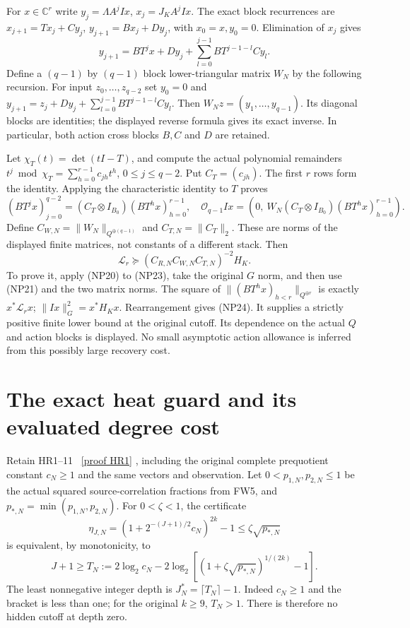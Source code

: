 \documentclass[11pt]{article}
\newcommand{\C}{\mathbb C}
\begin{document}
For $x\in\C^r$ write
$y_j=\Lambda A^jIx$, $x_j=J_KA^jIx$. The exact block recurrences
are $x_{j+1}=Tx_j+Cy_j$, $y_{j+1}=Bx_j+Dy_j$,
with $x_0=x,y_0=0$. Elimination of $x_j$ gives
\[
 y_{j+1}=BT^jx+Dy_j+
                 \sum_{l=0}^{j-1}BT^{j-1-l}Cy_l.
 \tag{NP22}
\]
Define a $(q-1)$ by $(q-1)$ block lower-triangular matrix $W_N$ by
the following recursion. For input $z_0,\ldots,z_{q-2}$ set $y_0=0$
and $y_{j+1}=z_j+Dy_j+\sum_{l=0}^{j-1}BT^{j-1-l}Cy_l$.
Then $W_Nz=(y_1,\ldots,y_{q-1})$. Its diagonal blocks are identities;
the displayed reverse formula gives its exact inverse. In particular,
both action cross blocks $B,C$ and $D$ are retained.

Let $\chi_T(t)=\det(tI-T)$, and compute the actual polynomial
remainders
$t^j\bmod\chi_T=\sum_{h=0}^{r-1}c_{jh}t^h$, $0\le j\le q-2$.
Put $C_T=(c_{jh})$. The first $r$ rows form the identity. Applying
the characteristic identity to $T$ proves
\[
 (BT^jx)_{j=0}^{q-2}=(C_T\otimes I_{B_0})(BT^hx)_{h=0}^{r-1},
 \quad
 \mathcal O_{q-1}Ix=
 (0,\ W_N(C_T\otimes I_{B_0})(BT^hx)_{h=0}^{r-1}).
 \tag{NP23}
\]
Define $C_{W,N}=\|W_N\|_{Q^{\oplus(q-1)}}$ and
$C_{T,N}=\|C_T\|_2$. These are norms of the displayed finite
matrices, not constants of a different stack. Then
\[
 \boxed{\quad
 \mathcal L_r\succeq
    (C_{R,N}C_{W,N}C_{T,N})^{-2}H_K.
 \quad} \tag{NP24}
\]
To prove it, apply (NP20) to (NP23), take the original $G$ norm,
and then use (NP21) and the two matrix norms. The square of
$\|(BT^hx)_{h<r}\|_{Q^{\oplus r}}$ is exactly
$x^*\mathcal L_rx$; $\|Ix\|_G^2=x^*H_Kx$. Rearrangement gives
(NP24). It supplies a strictly positive finite lower bound at the
original cutoff. Its dependence on the actual $Q$ and action blocks
is displayed. No small asymptotic action allowance is inferred from
this possibly large recovery cost.

\section{The exact heat guard and its evaluated degree cost}
Retain HR1--11 \cite{heat}%
~\href{https://github.com/KokunoYumeto/zeta-function-research-reader/blob/5992ad50c0f2a06921f1fcaded7b4e38097c0739/workbenches/splitzero-tandem/continuations/20260920-original-kernel-mixed-determinants/providers/HEAT_OBSERVATION_RESPONSE_ERRORS.tex\#L22}{[proof HR1]}%
{}, including the original complete
prequotient constant $c_N\ge1$ and the same vectors and observation.
Let $0<p_{1,N},p_{2,N}\le1$ be the actual squared source-correlation
fractions from FW5, and $p_{*,N}=\min(p_{1,N},p_{2,N})$.
For $0<\zeta<1$, the certificate
\[
 \eta_{J,N}=(1+2^{-(J+1)/2}c_N)^{2k}-1
       \le\zeta\sqrt{p_{*,N}}
 \tag{NP25}
\]
is equivalent, by monotonicity, to
\[
 J+1\ge T_N:=2\log_2c_N-2\log_2
 \left[(1+\zeta\sqrt{p_{*,N}})^{1/(2k)}-1\right].
 \tag{NP26}
\]
The least nonnegative integer depth is $J_N^*=\lceil T_N\rceil-1$.
Indeed $c_N\ge1$ and the bracket is less than one; for the original
$k\ge9$, $T_N>1$. There is therefore no hidden cutoff at depth zero.
\end{document}
